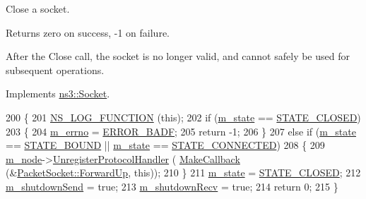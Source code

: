 Close a socket. 

\begin{DoxyReturn}{Returns}
zero on success, -\/1 on failure.
\end{DoxyReturn}
After the Close call, the socket is no longer valid, and cannot safely be used for subsequent operations. 

Implements \hyperlink{classns3_1_1Socket_abdac6e2498c5aa2963ef361d4200ddf3}{ns3\+::\+Socket}.


\begin{DoxyCode}
200 \{
201   \hyperlink{log-macros-disabled_8h_a90b90d5bad1f39cb1b64923ea94c0761}{NS\_LOG\_FUNCTION} (\textcolor{keyword}{this});
202   \textcolor{keywordflow}{if} (\hyperlink{classns3_1_1PacketSocket_adbf0f1f9b0a0bed7169ecdcb5a1ef66a}{m\_state} == \hyperlink{classns3_1_1PacketSocket_a376c65cdab494c41bd65f9aaeef543e5a6fe4f17ed49f9a87aba67738af434437}{STATE\_CLOSED})
203     \{
204       \hyperlink{classns3_1_1PacketSocket_ac1da4372f719a7fb20b8d7fa426f21cc}{m\_errno} = \hyperlink{classns3_1_1Socket_ada1328c5ae0c28cb2a982caf8f6d6ccaa9d232a0dd40ca7e637e974b88b973db9}{ERROR\_BADF};
205       \textcolor{keywordflow}{return} -1;
206     \}
207   \textcolor{keywordflow}{else} \textcolor{keywordflow}{if} (\hyperlink{classns3_1_1PacketSocket_adbf0f1f9b0a0bed7169ecdcb5a1ef66a}{m\_state} == \hyperlink{classns3_1_1PacketSocket_a376c65cdab494c41bd65f9aaeef543e5a22a3caeaebc3bfbb85d13fc9a807162a}{STATE\_BOUND} || \hyperlink{classns3_1_1PacketSocket_adbf0f1f9b0a0bed7169ecdcb5a1ef66a}{m\_state} == 
      \hyperlink{classns3_1_1PacketSocket_a376c65cdab494c41bd65f9aaeef543e5abba9e14603bb16ef4fa03ddfc1224641}{STATE\_CONNECTED})
208     \{
209       \hyperlink{classns3_1_1PacketSocket_a1d16a7bb40df82877d5b6b257861d566}{m\_node}->\hyperlink{classns3_1_1Node_a059495453e24a8fc768daea91732984b}{UnregisterProtocolHandler} (
      \hyperlink{group__makecallbackmemptr_ga9376283685aa99d204048d6a4b7610a4}{MakeCallback} (&\hyperlink{classns3_1_1PacketSocket_a889f1446a549aecd23e6f442791ae6b7}{PacketSocket::ForwardUp}, \textcolor{keyword}{this}));
210     \}
211   \hyperlink{classns3_1_1PacketSocket_adbf0f1f9b0a0bed7169ecdcb5a1ef66a}{m\_state} = \hyperlink{classns3_1_1PacketSocket_a376c65cdab494c41bd65f9aaeef543e5a6fe4f17ed49f9a87aba67738af434437}{STATE\_CLOSED};
212   \hyperlink{classns3_1_1PacketSocket_ad16347ae79f47e980085db3a2674dc40}{m\_shutdownSend} = \textcolor{keyword}{true};
213   \hyperlink{classns3_1_1PacketSocket_af766986fa3298b3156972c0559fb8fa5}{m\_shutdownRecv} = \textcolor{keyword}{true};
214   \textcolor{keywordflow}{return} 0;
215 \}
\end{DoxyCode}


